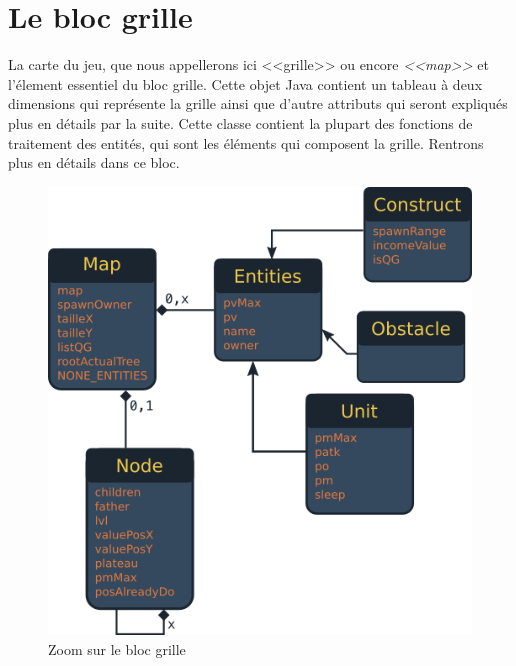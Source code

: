 \documentclass[a4paper,11pt]{report}
\begin{document}
    \section{Le bloc grille}
        La carte du jeu, que nous appellerons ici <<grille>> ou encore \textit{<<map>>} et l'élement essentiel du bloc grille. Cette objet Java contient un tableau à deux dimensions qui représente la grille ainsi que d'autre attributs qui seront expliqués plus en détails par la suite. Cette classe contient la plupart des fonctions de traitement des entités, qui sont les éléments qui composent la grille. Rentrons plus en détails dans ce bloc.
    \begin{figure}[th]
      \begin{center}
        \includegraphics[scale=0.4]{Assets/umlBlocGrille.png}
        \caption{Zoom sur le bloc grille}
        \label{fig6}
      \end{center}
    \end{figure}
\end{document}
